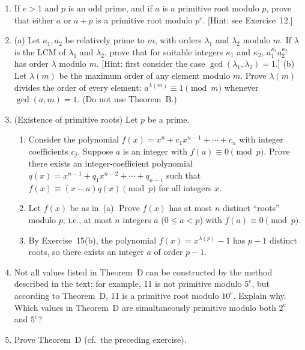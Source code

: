 \documentclass[12pt]{article}
\begin{document}
\begin{enumerate}
\item[\textbf{14.}] [$M18$] If $e > 1$ and $p$ is an odd prime, and if $a$ is a primitive root modulo $p$, prove that either $a$ or $a + p$ is a primitive root modulo $p^e$. [Hint: see Exercise~12.]

\item[\textbf{15.}] [$M29$] (a) Let $a_1, a_2$ be relatively prime to $m$, with orders $\lambda_1$ and $\lambda_2$ modulo $m$. If $\lambda$ is the LCM of $\lambda_1$ and $\lambda_2$, prove that for suitable integers $\kappa_1$ and $\kappa_2$, $a_1^{\kappa_1} a_2^{\kappa_2}$ has order $\lambda$ modulo $m$. [Hint: first consider the case $\gcd(\lambda_1, \lambda_2) = 1$.] (b) Let $\lambda(m)$ be the maximum order of any element modulo $m$. Prove $\lambda(m)$ divides the order of every element: $a^{\lambda(m)} \equiv 1 \pmod{m}$ whenever $\gcd(a, m) = 1$. (Do not use Theorem~B.)

\item[\textbf{16.}] [$M24$] (Existence of primitive roots) Let $p$ be a prime.

\begin{enumerate}
\item[a)] Consider the polynomial $f(x) = x^n + c_1 x^{n-1} + \cdots + c_n$ with integer coefficients $c_j$. Suppose $a$ is an integer with $f(a) \equiv 0 \pmod{p}$. Prove there exists an integer-coefficient polynomial $q(x) = x^{n-1} + q_1 x^{n-2} + \cdots + q_{n-1}$ such that $f(x) \equiv (x - a)q(x) \pmod{p}$ for all integers $x$.
\item[b)] Let $f(x)$ be as in~(a). Prove $f(x)$ has at most $n$ distinct ``roots'' modulo $p$; i.e., at most $n$ integers $a$ ($0 \leq a < p$) with $f(a) \equiv 0 \pmod{p}$.
\item[c)] By Exercise~15(b), the polynomial $f(x) = x^{\lambda(p)} - 1$ has $p - 1$ distinct roots, so there exists an integer $a$ of order $p - 1$.
\end{enumerate}

\item[\textbf{17.}] [$M26$] Not all values listed in Theorem~D can be constructed by the method described in the text; for example, 11 is not primitive modulo $5^e$, but according to Theorem~D, 11 is a primitive root modulo $10^e$. Explain why. Which values in Theorem~D are simultaneously primitive modulo both $2^e$ and $5^e$?

\item[\textbf{18.}] [$M25$] Prove Theorem~D (cf.\ the preceding exercise).


\end{enumerate}
\end{document}
